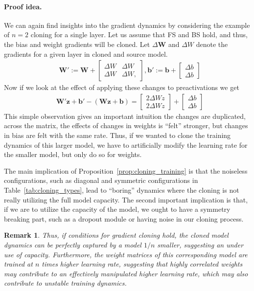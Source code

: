 \documentclass{article}
\newtheorem{remark}{Remark}
\newcommand{\1}{\mathbf{1}}
\newcommand{\B}[1]{\boldsymbol{#1}}
\begin{document}
\paragraph{Proof idea.} We can again find insights into the gradient dynamics by considering the example of $n=2$ cloning for a single layer. Let us assume that FS and BS hold, and thus, the bias and weight gradients will be cloned. Let $\Delta \B W$ and $\Delta W$ denote the gradients for a given layer in cloned and source model. 
\begin{align*}
    &\B W' := \B W + \begin{bmatrix}
        \Delta W & \Delta W \\
        \Delta W & \Delta W, 
    \end{bmatrix}, 
    \B b':= \B b + \begin{bmatrix}
        \Delta b \\ \Delta b 
    \end{bmatrix}
\end{align*}
Now if we look at the effect of applying these changes to preactivations we get
\begin{align*}   
&\B W'\B z + \B b' - (\B W \B z + \B b)  =  \begin{bmatrix}
        2\Delta W z \\ 2\Delta W z
    \end{bmatrix} + 
    \begin{bmatrix}
        \Delta b\\ \Delta b
    \end{bmatrix}
\end{align*}
This simple observation gives an important intuition the changes are duplicated, across the matrix, the effects of changes in weights is ``felt'' stronger, but changes in bias are felt with the same rate. Thus, if we wanted to clone the training dynamics of this larger model, we have to artificially modify the learning rate for the smaller model, but only do so for weights. 

The main implication of Proposition~\ref{prop:cloning_training} is that the noiseless configurations, such as diagonal and symmetric configurations in Table~\ref{tab:cloning_types}, lead to ``boring'' dynamics where the cloning is not really utilizing the full model capacity. The second important implication is that, if we are to utilize the capacity of the model, we ought to have a symmetry breaking part, such as a dropout module or having noise in our cloning process. 

\begin{remark}
    Thus, if conditions for gradient cloning hold, the cloned model dynamics can be perfectly captured by a model $1/n$ smaller, suggesting an under use of capacity. Furthermore, the weight matrices of this corresponding model are trained at $n$ times higher learning rate, suggesting that highly correlated weights may contribute to an effectively manipulated higher learning rate, which may also contribute to unstable training dynamics.  
\end{remark}
\end{document}
